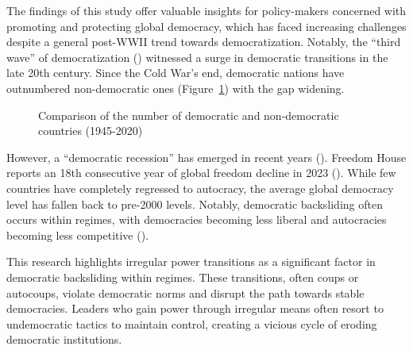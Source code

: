 \documentclass[
  12pt,
]{report}
\begin{document}
The findings of this study offer valuable insights for policy-makers
concerned with promoting and protecting global democracy, which has
faced increasing challenges despite a general post-WWII trend towards
democratization. Notably, the ``third wave'' of democratization
()
witnessed a surge in democratic transitions in the late 20th century.
Since the Cold War's end, democratic nations have outnumbered
non-democratic ones (Figure~\ref{fig-democracy}) with the gap widening.

\begin{figure}


\caption{\label{fig-democracy}Comparison of the number of democratic and
non-democratic countries (1945-2020)}

\end{figure}%

However, a ``democratic recession'' has emerged in recent years
(). Freedom House reports an
18th consecutive year of global freedom decline in 2023
(). While few
countries have completely regressed to autocracy, the average global
democracy level has fallen back to pre-2000 levels. Notably, democratic
backsliding often occurs within regimes, with democracies becoming less
liberal and autocracies becoming less competitive
().

This research highlights irregular power transitions as a significant
factor in democratic backsliding within regimes. These transitions,
often coups or autocoups, violate democratic norms and disrupt the path
towards stable democracies. Leaders who gain power through irregular
means often resort to undemocratic tactics to maintain control, creating
a vicious cycle of eroding democratic institutions.
\end{document}
